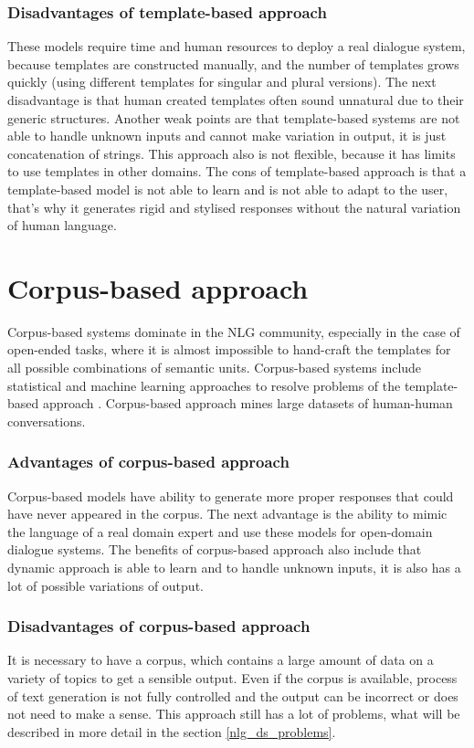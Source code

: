 \subsubsection{Disadvantages of template-based approach}
These models require time and human resources to deploy a real dialogue system, because templates are constructed manually, and the number of templates grows quickly (using different templates for singular and plural versions). The next disadvantage is that human created templates often sound unnatural due to their generic structures. Another weak points are that template-based systems are not able to handle unknown inputs and cannot make variation in output, it is just concatenation of strings. This approach also is not flexible, because it has limits to use templates in other domains. The cons of template-based approach is that a template-based model is not able to learn and is not able to adapt to the user, that's why it generates rigid and stylised responses without the natural variation of human language.

\section{Corpus-based approach}
Corpus-based systems dominate in the NLG community, especially in the case of open-ended tasks, where it is almost impossible to hand-craft the templates for all possible combinations of semantic units. Corpus-based systems include statistical and machine learning approaches to resolve problems of the template-based approach \cite{rudnicky2002dialog}. Corpus-based approach mines large datasets of human-human conversations.

\subsubsection{Advantages of corpus-based approach}
Corpus-based models have ability to generate more proper responses that could have never appeared in the corpus. The next advantage is the ability to mimic the language of a real domain expert and use these models for open-domain dialogue systems. The benefits of corpus-based approach also include that dynamic approach is able to learn and to handle unknown inputs, it is also has a lot of possible variations of output.

\subsubsection{Disadvantages of corpus-based approach}
It is necessary to have a corpus, which contains a large amount of data on a variety of topics to get a sensible output. Even if the corpus is available, process of text generation is not fully controlled and the output can be incorrect or does not need to make a sense. This approach still has a lot of problems, what will be described in more detail in the section \ref{nlg_ds_problems}. 

